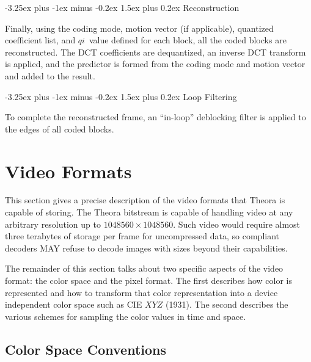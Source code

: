 \documentclass[9pt,letterpaper]{book}
\makeatletter
\newcommand{\idx}[1]{{\ensuremath{\mathit{#1}}}}
\newcommand{\qi}{\idx{qi}}
\numberwithin{equation}{chapter}
\numberwithin{figure}{chapter}
\numberwithin{table}{chapter}
\renewcommand{\paragraph}{\@startsection{paragraph}{4}{0ex}%
 {-3.25ex plus -1ex minus -0.2ex}%
 {1.5ex plus 0.2ex}%
 {\normalfont\normalsize\bfseries}}
\makeatother
\begin{document}
\paragraph{Reconstruction}

Finally, using the coding mode, motion vector (if applicable), quantized
 coefficient list, and \qi\ value defined for each block, all the coded blocks
 are reconstructed.
The DCT coefficients are dequantized, an inverse DCT transform is applied, and
 the predictor is formed from the coding mode and motion vector and added to
 the result.

\paragraph{Loop Filtering}

To complete the reconstructed frame, an ``in-loop'' deblocking filter is
 applied to the edges of all coded blocks.


\chapter{Video Formats}

This section gives a precise description of the video formats that Theora is
 capable of storing.
The Theora bitstream is capable of handling video at any arbitrary resolution
 up to $1048560\times 1048560$.
Such video would require almost three terabytes of storage per frame for
 uncompressed data, so compliant decoders MAY refuse to decode images with
 sizes beyond their capabilities.

The remainder of this section talks about two specific aspects of the video
 format: the color space and the pixel format.
The first describes how color is represented and how to transform that color
 representation into a device independent color space such as CIE $XYZ$ (1931).
The second describes the various schemes for sampling the color values in time
 and space.

\section{Color Space Conventions}
\end{document}
